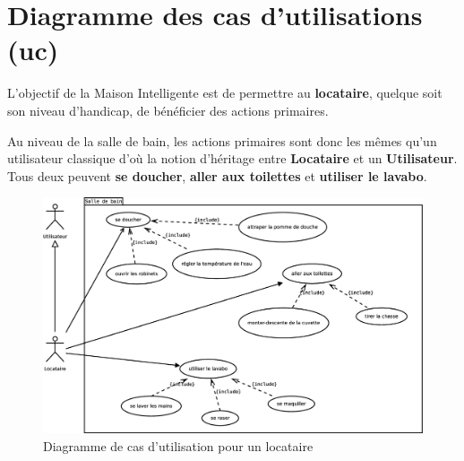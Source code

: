 \chapter{Diagramme des cas d'utilisations (uc)}
L'objectif de la Maison Intelligente est de permettre au \textbf{locataire}, quelque soit son niveau d'handicap, de bénéficier des actions primaires. 

Au niveau de la salle de bain, les actions primaires sont donc les mêmes qu'un utilisateur classique d'où la notion d'héritage entre \textbf{Locataire} et un \textbf{Utilisateur}. Tous deux peuvent \textbf{se doucher}, \textbf{aller aux toilettes} et \textbf{utiliser le lavabo}. \\

\begin{figure}[H]
	\centering
	\includegraphics[width=1\linewidth]{diagrams/bathroom/diagramme_cas_utilisation_uc.eps}
	\caption{Diagramme de cas d'utilisation pour un locataire}
	\label{fig:diagramme_cas_utilisation_uc}
\end{figure}
